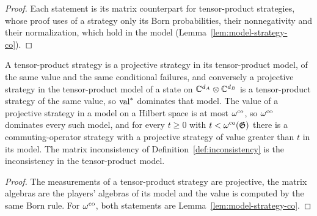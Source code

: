 \begin{proof}
\leanok
Each statement is its matrix counterpart for tensor-product strategies, whose proof uses of a
strategy only its Born probabilities, their nonnegativity and their normalization, which hold in
the model (Lemma~\ref{lem:model-strategy-co}).
\end{proof}

\begin{lemma}
\label{lem:model-proj-strategy-values}
\leanok
A tensor-product strategy is a projective strategy in its tensor-product model, of the same value
and the same conditional failures, and conversely a projective strategy in the tensor-product
model of a state on $\mathbb{C}^{d_A} \otimes \mathbb{C}^{d_B}$ is a tensor-product strategy of the same value, so
$\mathrm{val}^*$ dominates that model. The value of a projective strategy in a model on a Hilbert space
is at most $\omega^{\mathrm{co}}$, so $\omega^{\mathrm{co}}$ dominates every such model, and for every $t \geq 0$ with
$t < \omega^{\mathrm{co}}(\mathfrak{G})$ there is a commuting-operator strategy with a projective strategy of value
greater than $t$ in its model. The matrix inconsistency of Definition~\ref{def:inconsistency} is
the inconsistency in the tensor-product model.
\end{lemma}

\begin{proof}
\leanok
The measurements of a tensor-product strategy are projective, the matrix algebras are the players'
algebras of its model and the value is computed by the same Born rule. For $\omega^{\mathrm{co}}$, both
statements are Lemma~\ref{lem:model-strategy-co}.
\end{proof}

